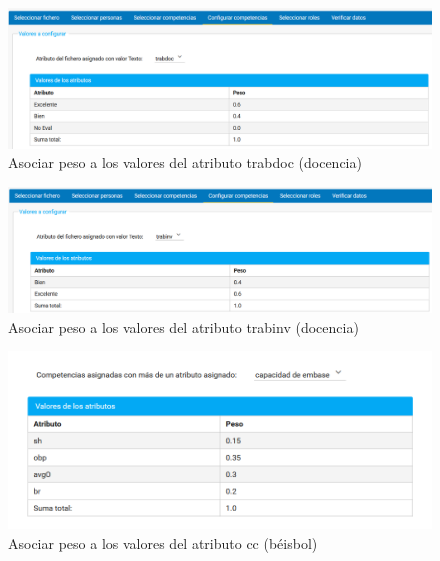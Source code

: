 {\begin{figure}[H]
	\centering
	\includegraphics[width=\textwidth]{figuras/docencia_config_competencias_doc.png}
	\caption{Asociar peso a los valores del atributo trabdoc (docencia)} \label{fig:conf_comp_doc_docencia}
\end{figure}

\begin{figure}[H]
	\centering
	\includegraphics[width=\textwidth]{figuras/docencia_config_competencias_inv.png}
	\caption{Asociar peso a los valores del atributo trabinv (docencia)} \label{fig:conf_comp_inv_docencia}
\end{figure}


\begin{figure}[H]
	\centering
	\includegraphics[width=\textwidth]{figuras/beisbol_conf_comp_ce.png}
	\caption{Asociar peso a los valores del atributo cc (béisbol)} \label{fig:conf_comp_ce_beisbol}
\end{figure}

}
